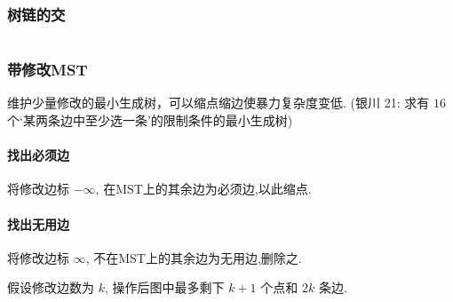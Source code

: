 \subsubsection{树链的交}
	\inputminted{cpp}{sections/Tree/assets/yzh/path_inter.cpp}

\subsubsection{带修改MST}
	维护少量修改的最小生成树，可以缩点缩边使暴力复杂度变低. (银川 21: 求有 $16$ 个`某两条边中至少选一条'的限制条件的最小生成树) 
	\paragraph{找出必须边}将修改边标 $-\infty$, 在MST上的其余边为必须边,以此缩点.
	\paragraph{找出无用边}将修改边标 $\infty$, 不在MST上的其余边为无用边,删除之. 

	假设修改边数为 $k$, 操作后图中最多剩下 $k+1$ 个点和 $2k$ 条边.
	

